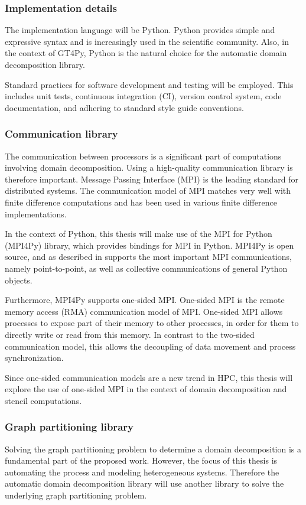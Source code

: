 \subsubsection{Implementation details}
The implementation language will be Python.
Python provides simple and expressive syntax and is increasingly used in the scientific community.
Also, in the context of GT4Py, Python is the natural choice for the automatic domain decomposition library.

Standard practices for software development and testing will be employed.
This includes unit tests, continuous integration (CI), version control system, code documentation, and adhering to standard style guide conventions.

\subsubsection{Communication library}
The communication between processors is a significant part of computations involving domain decomposition.
Using a high-quality communication library is therefore important.
Message Passing Interface (MPI) is the leading standard for distributed systems.
The communication model of MPI matches very well with finite difference computations and has been used in various finite difference implementations.

In the context of Python, this thesis will make use of the MPI for Python (MPI4Py) library, which provides bindings for MPI in Python.
MPI4Py is open source, and as described in \cite{dalcin2005mpi} supports the most important MPI communications, namely point-to-point, as well as collective communications of general Python objects.

Furthermore, MPI4Py supports one-sided MPI.
One-sided MPI is the remote memory access (RMA) communication model of MPI.
One-sided MPI allows processes to expose part of their memory to other processes, in order for them to directly write or read from this memory.
In contrast to the two-sided communication model, this allows the decoupling of data movement and process synchronization.

Since one-sided communication models are a new trend in HPC, this thesis will explore the use of one-sided MPI in the context of domain decomposition and stencil computations.

\subsubsection{Graph partitioning library}
Solving the graph partitioning problem to determine a domain decomposition is a fundamental part of the proposed work.
However, the focus of this thesis is automating the process and modeling heterogeneous systems.
Therefore the automatic domain decomposition library will use another library to solve the underlying graph partitioning problem.

